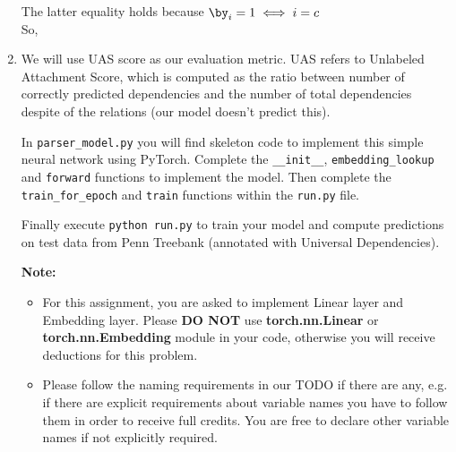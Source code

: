 \begin{parts}
\begin{enumerate}[label=\roman*.]
{{            }
        The latter equality holds because $\by_i=1\iff i=c$\\
        So,
        }
        \item We will use UAS score as our evaluation metric. UAS refers to Unlabeled Attachment Score, which is computed as the ratio between number of correctly predicted dependencies and the number of total dependencies despite of the relations (our model doesn't predict this).\newline
    
   In \texttt{parser\_model.py} you will find skeleton code to implement this simple neural network using PyTorch. Complete the \texttt{\_\_init\_\_}, \texttt{embedding\_lookup} and \texttt{forward} functions to implement the model. Then complete the \texttt{train\_for\_epoch} and \texttt{train} functions within the \texttt{run.py} file.
   
    Finally execute \texttt{python run.py} to train your model and compute predictions
    on test data from Penn Treebank (annotated with Universal Dependencies). 
    
    \textbf{Note:}
    \begin{itemize}
        \item For this assignment, you are asked to implement Linear layer and Embedding layer. Please \textbf{DO NOT} use \textbf{torch.nn.Linear} or  \textbf{torch.nn.Embedding} module in your code, otherwise you will receive deductions for this problem. 
        \item Please follow the naming requirements in our TODO if there are any, e.g. if there are explicit requirements about variable names you have to follow them in order to receive full credits. You are free to declare other variable names if not explicitly required. 
    \end{itemize}
    

\end{enumerate}
\end{parts}
